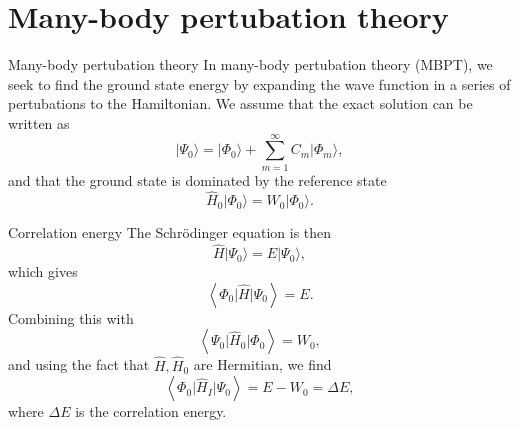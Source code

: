 \documentclass[UKenglish,aspectratio=169]{beamer}
\begin{document}
\section{Many-body pertubation theory}

\begin{frame}{Many-body pertubation theory}
    In many-body pertubation theory (MBPT), we seek to find the
    ground state energy by expanding the wave function in a series of
    pertubations to the Hamiltonian.
    We assume that the exact solution can be written as
    \begin{equation}
        \lvert \Psi_0 \rangle
        = \lvert \Phi_0 \rangle + \sum_{m = 1}^\infty C_m \lvert \Phi_m \rangle,
    \end{equation}
    and that the ground state is dominated by the reference state
    \begin{equation}
        \hat{H}_0 \lvert \Phi_0 \rangle = W_0 \lvert \Phi_0 \rangle.
    \end{equation}
\end{frame}

\begin{frame}{Correlation energy}
    The Schrödinger equation is then
    \begin{equation}
        \hat{H} \lvert \Psi_0 \rangle = E \lvert \Psi_0 \rangle,
    \end{equation}
    which gives
    \begin{equation}
        \left\langle \Phi_0 \vert \hat{H} \vert \Psi_0 \right\rangle = E.
    \end{equation}
    Combining this with
    \begin{equation}
        \left\langle \Psi_0 \vert \hat{H}_0 \vert \Phi_0 \right\rangle = W_0,
    \end{equation}
    and using the fact that $\hat{H}, \hat{H}_0$ are Hermitian, we find
    \begin{equation}\label{eq:corr_energy_original}
        \left\langle \Phi_0 \vert \hat{H}_I \vert \Psi_0 \right\rangle
        = E - W_0
        = \Delta E,
    \end{equation}
    where $\Delta E$ is the correlation energy.
\end{frame}
\end{document}
